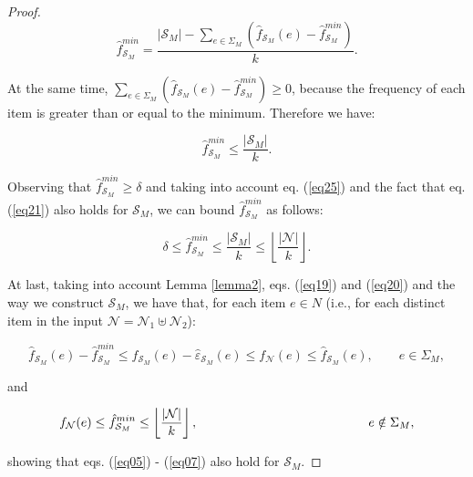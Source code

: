 \documentclass[final,3p,times]{elsarticle}
\newcommand\noi{\noindent}
\begin{document}
\begin{proof}
\begin{equation}
\label{eq24}
\hat{f}_{\mathcal{S}_M}^{min} =  \frac{\left\vert{\mathcal{S}_M}\right\vert - \sum_{e \in \Sigma_M} (\hat{f}_{\mathcal{S}_M}(e) - \hat{f}_{\mathcal{S}_M}^{min})}{k}.
\end{equation}

At the same time, $\sum_{e \in \Sigma_M} (\hat{f}_{\mathcal{S}_M}(e) - \hat{f}_{\mathcal{S}_M}^{min}) \geq 0$, because the frequency of each item is greater than or equal to the minimum. Therefore we have:

\begin{equation}
\label{eq25}
\hat{f}_{\mathcal{S}_M}^{min} \leq  \frac{\left\vert{\mathcal{S}_M}\right\vert}{k}.
\end{equation}

Observing that $\hat{f}_{\mathcal{S}_M}^{min} \geq \delta$ and taking into account eq. (\ref{eq25}) and the fact that eq. (\ref{eq21}) also holds for $\mathcal{S}_M$, we can bound $\hat{f}_{\mathcal{S}_M}^{min}$ as follows:

\begin{equation}
\label{eq26}
\delta \leq \hat{f}_{\mathcal{S}_M}^{min} \leq  \frac{\left\vert{\mathcal{S}_M}\right\vert}{k} \leq \left\lfloor\frac{\left\vert{\mathcal{N}}\right\vert}{k}\right\rfloor.
\end{equation}

At last, taking into account Lemma \ref{lemma2}, eqs. (\ref{eq19}) and (\ref{eq20}) and the way we construct $\mathcal{S}_M$, we have that, for each item $e \in N$ (i.e., for each distinct item in the input $\mathcal{N} = \mathcal{N}_1 \uplus \mathcal{N}_2$):

\begin{equation}
\label{eq27}
\hat{f}_{\mathcal{S}_M}(e) - \hat{f}_{\mathcal{S}_M}^{min} \leq \hat{f}_{\mathcal{S}_M}(e) - \hat{\varepsilon}_{\mathcal{S}_M}(e) \leq f_\mathcal{N}(e) \leq  \hat{f}_{\mathcal{S}_M}(e), \qquad e \in \Sigma_M,
\end{equation}

and

\begin{equation}
\label{eq28}
f_\mathcal{N}(e) \leq  \hat{f}_{\mathcal{S}_M}^{min} \leq \left\lfloor\frac{\left\vert{\mathcal{N}}\right\vert}{k}\right\rfloor, \qquad \hspace{40 mm} e \notin \Sigma_M,
\end{equation}

\noi showing that eqs. (\ref{eq05}) - (\ref{eq07}) also hold for $\mathcal{S}_M$.

\end{proof}
\end{document}
